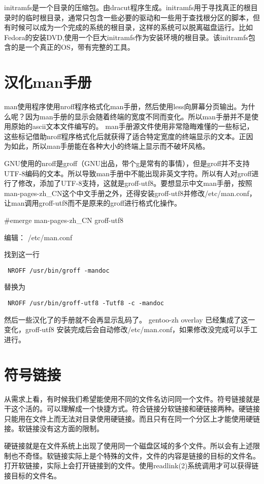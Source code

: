 initramfs是一个目录的压缩包。由dracut程序生成。initramfs用于寻找真正的根目录时的临时根目录，通常只包含一些必要的驱动和一些用于查找根分区的脚本，但有时候可以成为一个完成的系统的根目录，这样的系统可以脱离磁盘运行。比如Fedora的安装DVD,使用一个巨大initramfs作为安装环境的根目录。该initramfs包含的是一个真正的OS，带有完整的工具。


\section{汉化man手册}\label{FAQ:zhman}

man使用程序使用nroff程序格式化man手册，然后使用less向屏幕分页输出。为什么呢？因为man手册的显示会随着终端的宽度不同而变化。所以man手册并不是使用原始的ascii文本文件编写的。
man手册源文件使用非常隐晦难懂的一些标记，这些标记借助nroff程序格式化后就获得了适合特定宽度的终端显示的文本。正因为如此，所以man手册能在各种大小的终端上显示而不破坏风格。

GNU使用的nroff是groff（GNU出品，带个g是常有的事情），但是groff并不支持UTF-8编码的文本。所以导致man手册中不能出现非英文字符。所以有人对groff进行了修改，添加了UTF-8支持，这就是groff-utf8。要想显示中文man手册，按照man-pages-zh\_CN这个中文手册之外，还得安装groff-utf8并修改/etc/man.conf，让man调用groff-utf8而不是原来的groff进行格式化操作。

\begin{code}
\#emerge man-pages-zh\_CN groff-utf8
\end{code}

编辑： /etc/man.conf 

找到这一行

{
\tt
NROFF           /usr/bin/groff -mandoc
}

替换为

{ \tt
NROFF           /usr/bin/groff-utf8 -Tutf8 -c -mandoc
}

然后一些汉化了的手册就不会再显示乱码了。
gentoo-zh overlay 已经集成了这一变化，groff-utf8 安装完成后会自动修改/etc/man.conf，如果修改没完成可以手工进行。

\section{符号链接}\label{faq:symlink}

从需求上看，有时候我们希望能使用不同的文件名访问同一个文件。符号链接就是干这个活的。可以理解成一个快捷方式。符合链接分软链接和硬链接两种。硬链接只能用在文件上而无法对目录使用硬链接。而且只有在同一个分区上才能使用硬链接。软链接没有这方面的限制。

硬链接就是在文件系统上出现了使用同一个磁盘区域的多个文件。所以会有上述限制也不奇怪。软链接实际上是个特殊的文件，文件的内容是链接的目标的文件名。打开软链接，实际上会打开链接到的文件。使用readlink(2)系统调用才可以获得链接目标的文件名。


